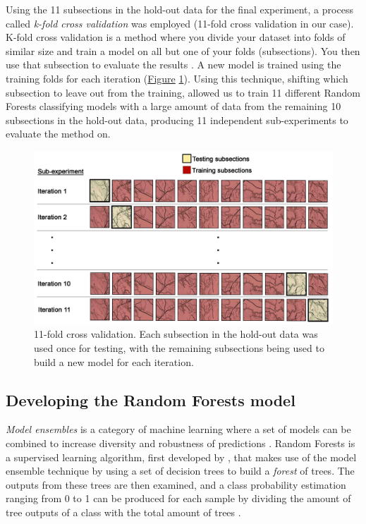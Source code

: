\documentclass[]{interact}
\theoremstyle{plain}%
\theoremstyle{definition}
\theoremstyle{remark}
\begin{document}
Using the 11 subsections in the hold-out data for the final experiment, a process called \textit{k-fold cross validation} was employed (11-fold cross validation in our case). K-fold cross validation is a method where you divide your dataset into folds of similar size and train a model on all but one of your folds (subsections). You then use that subsection to evaluate the results \citep{crossvalidation}. A new model is trained using the training folds for each iteration (\hyperref[fig:crossvalidation]{Figure} \ref{fig:crossvalidation}). Using this technique, shifting which subsection to leave out from the training, allowed us to train 11 different Random Forests classifying models with a large amount of data from the remaining 10 subsections in the hold-out data, producing 11 independent sub-experiments to evaluate the method on.

\begin{figure}[!htb]
    \centering
    \includegraphics[width=1\linewidth]{images/cross_validation_lo.jpg}
    \caption{11-fold cross validation. Each subsection in the hold-out data was used once for testing, with the remaining subsections being used to build a new model for each iteration.}
    \label{fig:crossvalidation}
\end{figure}

\subsection{Developing the Random Forests model}

\textit{Model ensembles} is a category of machine learning where a set of models can be combined to increase diversity and robustness of predictions \citep{flach}. Random Forests is a supervised learning algorithm, first developed by \citet{breiman}, that makes use of the model ensemble technique by using a set of decision trees to build a \textit{forest} of trees. The outputs from these trees are then examined, and a class probability estimation ranging from 0 to 1 can be produced for each sample by dividing the amount of tree outputs of a class with the total amount of trees \citep{breiman}.
\end{document}
